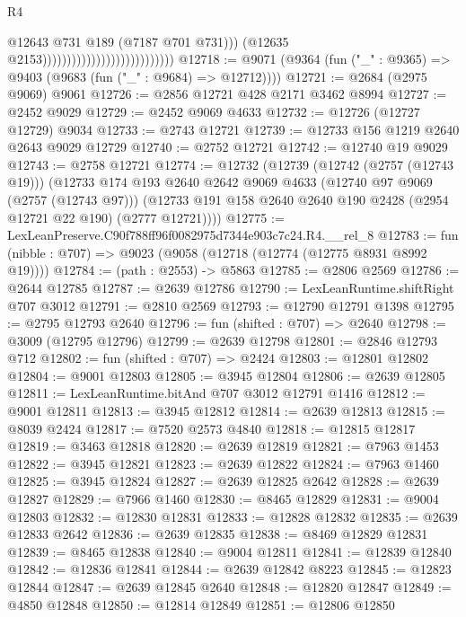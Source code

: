 \begin{lexlean}{R4}
\begin{coremodule}
                                                            @12643
                                                            @731
                                                            @189
                                                            (@7187 @701 @731)))
                                                        (@12635 @2153)))))))))))))))))))))))))))
@12718 := @9071 (@9364 (fun ("_" : @9365) => @9403 (@9683 (fun ("_" : @9684) => @12712))))
@12721 := @2684 (@2975 @9069) @9061
@12726 := @2856 @12721 @428 @2171 @3462 @8994
@12727 := @2452 @9029
@12729 := @2452 @9069 @4633
@12732 := @12726 (@12727 @12729) @9034
@12733 := @2743 @12721
@12739 := @12733 @156 @1219 @2640 @2643 @9029 @12729
@12740 := @2752 @12721
@12742 := @12740 @19 @9029
@12743 := @2758 @12721
@12774 := @12732
    (@12739
      (@12742 (@2757 (@12743 @19)))
      (@12733
        @174
        @193
        @2640
        @2642
        @9069
        @4633
        (@12740 @97 @9069 (@2757 (@12743 @97)))
        (@12733 @191 @158 @2640 @2640 @190 @2428 (@2954 @12721 @22 @190) (@2777 @12721))))
@12775 := LexLeanPreserve.C90f788ff96f0082975d7344e903c7c24.R4.__rel_8
@12783 := fun (nibble : @707) => @9023 (@9058 (@12718 (@12774 (@12775 @8931 @8992 @19))))
@12784 := (path : @2553) -> @5863
@12785 := @2806 @2569
@12786 := @2644 @12785
@12787 := @2639 @12786
@12790 := LexLeanRuntime.shiftRight @707 @3012
@12791 := @2810 @2569
@12793 := @12790 @12791 @1398
@12795 := @2795 @12793 @2640
@12796 := fun (shifted : @707) => @2640
@12798 := @3009 (@12795 @12796)
@12799 := @2639 @12798
@12801 := @2846 @12793 @712
@12802 := fun (shifted : @707) => @2424
@12803 := @12801 @12802
@12804 := @9001 @12803
@12805 := @3945 @12804
@12806 := @2639 @12805
@12811 := LexLeanRuntime.bitAnd @707 @3012 @12791 @1416
@12812 := @9001 @12811
@12813 := @3945 @12812
@12814 := @2639 @12813
@12815 := @8039 @2424
@12817 := @7520 @2573 @4840
@12818 := @12815 @12817
@12819 := @3463 @12818
@12820 := @2639 @12819
@12821 := @7963 @1453
@12822 := @3945 @12821
@12823 := @2639 @12822
@12824 := @7963 @1460
@12825 := @3945 @12824
@12827 := @2639 @12825 @2642
@12828 := @2639 @12827
@12829 := @7966 @1460
@12830 := @8465 @12829
@12831 := @9004 @12803
@12832 := @12830 @12831
@12833 := @12828 @12832
@12835 := @2639 @12833 @2642
@12836 := @2639 @12835
@12838 := @8469 @12829 @12831
@12839 := @8465 @12838
@12840 := @9004 @12811
@12841 := @12839 @12840
@12842 := @12836 @12841
@12844 := @2639 @12842 @8223
@12845 := @12823 @12844
@12847 := @2639 @12845 @2640
@12848 := @12820 @12847
@12849 := @4850 @12848
@12850 := @12814 @12849
@12851 := @12806 @12850

\end{coremodule}
\end{lexlean}

